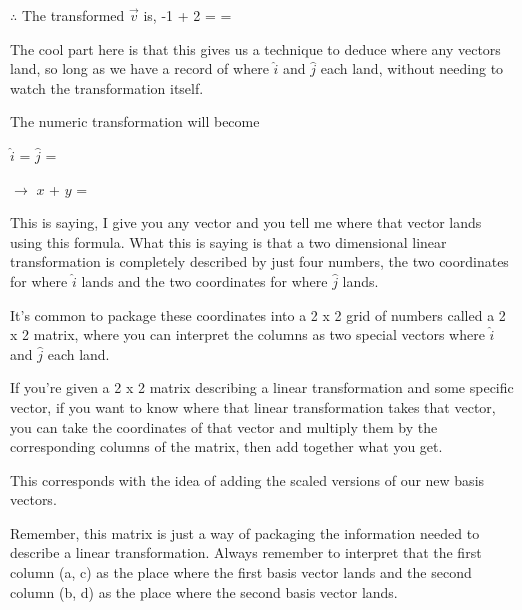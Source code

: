 \documentclass[12pt]{article}
\begin{document}

$\therefore$ The transformed $\vec{v}$ is, -1 + 2 =  = 

The cool part here is that this gives us a technique to deduce where any vectors land, so long as we have a record of where $\hat{i}$ and $\hat{j}$ each land, without needing to watch the transformation itself.

The numeric transformation will become

\begin{center}
    $\hat{i}$ =  $\hat{j}$ = 
\end{center}

\begin{center}
     $\longrightarrow$ $x$ + $y$ = 
\end{center}


This is saying, I give you any vector and you tell me where that vector lands using this formula. What this is saying is that a two dimensional linear transformation is completely described by just four numbers, the two coordinates for where $\hat{i}$ lands and the two coordinates for where $\hat{j}$ lands.

It's common to package these coordinates into a 2 x 2 grid of numbers called a 2 x 2 matrix, where you can interpret the columns as two special vectors where $\hat{i}$ and $\hat{j}$ each land.


If you're given a 2 x 2 matrix describing a linear transformation and some specific vector, if you want to know where that linear transformation takes that vector, you can take the coordinates of that vector and multiply them by the corresponding columns of the matrix, then add together what you get.

This corresponds with the idea of adding the scaled versions of our new basis vectors.


Remember, this matrix is just a way of packaging the information needed to describe a linear transformation. Always remember to interpret that the first column (a, c) as the place where the first basis vector lands and the second column (b, d) as the place where the second basis vector lands.
\end{document}
